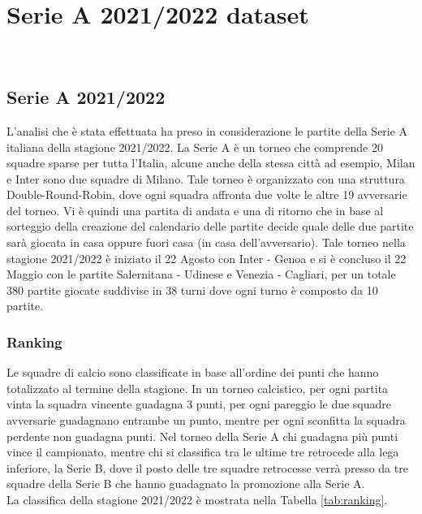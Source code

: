 
\chapter{Serie A 2021/2022 dataset }

\\

\section{Serie A 2021/2022}

L'analisi che è stata effettuata ha preso in considerazione le partite della Serie A italiana della stagione 2021/2022. La Serie A è un torneo che comprende 20 squadre sparse per tutta l'Italia, alcune anche della stessa città ad esempio, Milan e Inter sono due squadre di Milano. Tale torneo è organizzato con una struttura Double-Round-Robin, dove ogni squadra affronta due volte le altre 19 avversarie del torneo. Vi è quindi una partita di andata e una di ritorno che in base al sorteggio della creazione del calendario delle partite decide quale delle due partite sarà giocata in casa oppure fuori casa (in casa dell'avversario). Tale torneo nella stagione 2021/2022 è iniziato il 22 Agosto con Inter - Genoa e si è concluso il 22 Maggio con le partite Salernitana - Udinese e Venezia - Cagliari, per un totale 380 partite giocate suddivise in 38 turni dove ogni turno è composto da 10 partite.

\subsection{Ranking}
Le squadre di calcio sono classificate in base all'ordine dei punti che hanno totalizzato al termine della stagione. In un torneo calcistico, per ogni partita vinta la squadra vincente guadagna 3 punti, per ogni pareggio le due squadre avversarie guadagnano entrambe un punto, mentre per ogni sconfitta la squadra perdente non guadagna punti. Nel torneo della Serie A chi guadagna più punti vince il campionato, mentre chi si classifica tra le ultime tre retrocede alla lega inferiore, la Serie B, dove il posto delle tre squadre retrocesse verrà presso da tre squadre della Serie B che hanno guadagnato la promozione alla Serie A.\\ 
La classifica della stagione 2021/2022 è mostrata nella Tabella \ref{tab:ranking}.

